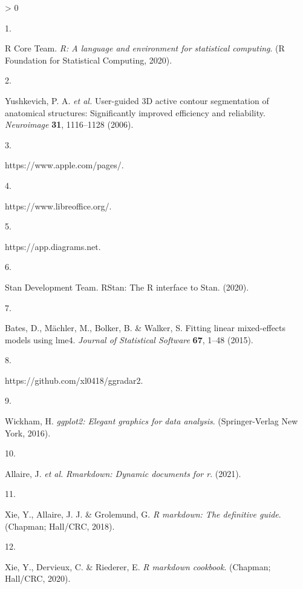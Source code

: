 \documentclass[
  12pt,
]{article}
\newlength{\cslhangindent}
\newlength{\csllabelwidth}
\newenvironment{CSLReferences}[3] %
 {%
  \setlength{\parindent}{0pt}
  \ifodd #1 \everypar{\setlength{\hangindent}{\cslhangindent}}\ignorespaces\fi
  \ifnum #2 > 0
  \setlength{\parskip}{#3\baselineskip}
  \fi
 }%
 {}
\newcommand{\CSLLeftMargin}[1]{\parbox[t]{\maxof{\widthof{#1}}{\csllabelwidth}}{#1}}
\newcommand{\CSLRightInline}[1]{\parbox[t]{\linewidth}{#1}}
\begin{document}
\hypertarget{refs}{}
\begin{CSLReferences}{0}{0}
\leavevmode\hypertarget{ref-R}{}%
\CSLLeftMargin{1. }
\CSLRightInline{R Core Team. \emph{{R}: A language and environment for
statistical computing}. (R Foundation for Statistical Computing, 2020).}

\leavevmode\hypertarget{ref-yushkevich:2006aa}{}%
\CSLLeftMargin{2. }
\CSLRightInline{Yushkevich, P. A. \emph{et al.} User-guided {3D} active
contour segmentation of anatomical structures: Significantly improved
efficiency and reliability. \emph{Neuroimage} \textbf{31}, 1116--1128
(2006).}

\leavevmode\hypertarget{ref-pages}{}%
\CSLLeftMargin{3. }
\CSLRightInline{{https://www.apple.com/pages/}.}

\leavevmode\hypertarget{ref-libreoffice}{}%
\CSLLeftMargin{4. }
\CSLRightInline{{https://www.libreoffice.org/}.}

\leavevmode\hypertarget{ref-diagrams}{}%
\CSLLeftMargin{5. }
\CSLRightInline{{https://app.diagrams.net}.}

\leavevmode\hypertarget{ref-rstan}{}%
\CSLLeftMargin{6. }
\CSLRightInline{Stan Development Team. {RStan}: The {R} interface to
{Stan}. (2020).}

\leavevmode\hypertarget{ref-Bates:2015aa}{}%
\CSLLeftMargin{7. }
\CSLRightInline{Bates, D., Mächler, M., Bolker, B. \& Walker, S. Fitting
linear mixed-effects models using {lme4}. \emph{Journal of Statistical
Software} \textbf{67}, 1--48 (2015).}

\leavevmode\hypertarget{ref-ggradar2}{}%
\CSLLeftMargin{8. }
\CSLRightInline{{https://github.com/xl0418/ggradar2}.}

\leavevmode\hypertarget{ref-Wickham:2016aa}{}%
\CSLLeftMargin{9. }
\CSLRightInline{Wickham, H. \emph{ggplot2: Elegant graphics for data
analysis}. (Springer-Verlag New York, 2016).}

\leavevmode\hypertarget{ref-Allaire:2021aa}{}%
\CSLLeftMargin{10. }
\CSLRightInline{Allaire, J. \emph{et al.} \emph{Rmarkdown: Dynamic
documents for r}. (2021).}

\leavevmode\hypertarget{ref-Xie:2018aa}{}%
\CSLLeftMargin{11. }
\CSLRightInline{Xie, Y., Allaire, J. J. \& Grolemund, G. \emph{R
markdown: The definitive guide}. (Chapman; Hall/CRC, 2018).}

\leavevmode\hypertarget{ref-Xie:2020aa}{}%
\CSLLeftMargin{12. }
\CSLRightInline{Xie, Y., Dervieux, C. \& Riederer, E. \emph{R markdown
cookbook}. (Chapman; Hall/CRC, 2020).}


\end{CSLReferences}
\end{document}

